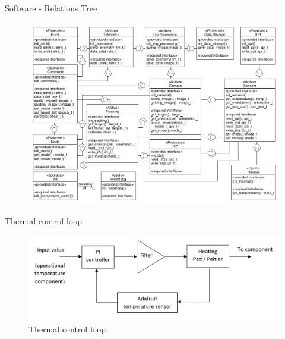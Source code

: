 \documentclass[11pt, aspectratio=169]{beamer}
\begin{document}
\begin{frame}[c]{Software - Relations Tree}
    \begin{figure}
        \includegraphics[height=.9\textheight]{software/complete_relations_tree.png}
    \end{figure}
\end{frame}

\begin{frame}[c]{Thermal control loop}
    \begin{figure}
        \includegraphics[width=\textwidth]{figures/images/thermalcontrol.png}
        \caption*{Thermal control loop}
    \end{figure}
\end{frame}

\end{document}
